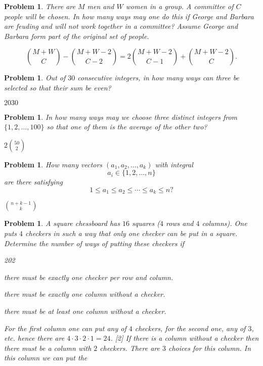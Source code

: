 \documentclass[11pt, openany]{book}
\theoremstyle{change} \theoremheaderfont{\blue\sffamily\bfseries}
\newtheorem{pro}[thm]{Problem}
\theoremstyle{nonumberplain} \theoremheaderfont{\sffamily\bfseries}
\def\binom#1#2{{#1\choose#2}}
\newcommand{\í}{\'{\i}}
\begin{document}
\begin{multicols}{2}
\begin{pro}
There are $M$ men and $W$ women in a group. A committee of $C$
people will be chosen. In how many ways may one do this if George
and Barbara are feuding and will not work together in a committee?
Assume George and Barbara form part of the original set of people.
\begin{answer}$$\binom{M + W}{C} - \binom{M + W - 2}{C-2}=2\binom{M + W-2}{C-1}  + \binom{M + W-2}{C}.$$
\end{answer}
    \end{pro}
         \begin{pro}
Out of $30$ consecutive integers, in how many ways can three be
selected so that their sum be even?
\begin{answer}$2030$
\end{answer}
   \end{pro}
      \begin{pro}
In how many ways may we choose three distinct integers from $\{1,2,
\ldots, 100\}$ so that one of them is the average of the other two?
\begin{answer}$2\binom{50}{2}$
\end{answer}
  \end{pro}
      \begin{pro}How many vectors $(a_1, a_2, \ldots, a_k)$ with integral $$a_i\in \{1,2, \ldots , n\}$$
are there satisfying $$1 \leq a_1 \leq a_2 \leq \cdots \leq a_k \leq
n?$$   \begin{answer} $\binom{n + k -1}{k}$
\end{answer}
 \end{pro}
 \begin{pro}
A square chessboard has $16$ squares ($4$ rows and $4$ columns). One
puts $4$ checkers in such a way that  only one checker can be put in
a square. Determine the number of ways of putting these checkers if
\begin{dingautolist}{202}
\item there must be exactly one checker per row and column. \item
there must be exactly one column without a checker. \item there must
be at least one column without a checker.
\end{dingautolist}
\begin{answer} [1] For the first column one can put any of $4$ checkers, for the second one, any of $3$, etc. hence there
are  $4 \cdot 3 \cdot 2 \cdot 1 = 24$. [2] If there is a column
without a checker then there must be a column with $2$ checkers.
There are $3$ choices for this column. In this column we can put the

\end{answer}
\end{pro}
\end{multicols}
\end{document}
